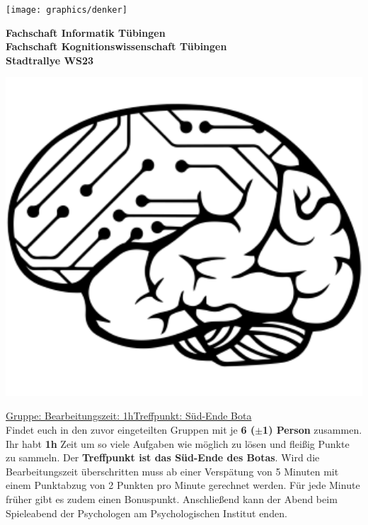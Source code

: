 \documentclass[11pt,paper=a4,answers]{exam}
\newcommand{\semester}{WS23}
\newcommand{\bearbeitungszeit}{1h}
\newcommand{\treffpunkt}{Süd-Ende Bota}
\newcommand{\treffpunktinline}{das Süd-Ende des Botas}
\begin{document}
	
\noindent
\begin{minipage}[l]{.1\textwidth}
\noindent
\texttt{[image: graphics/denker]}
\end{minipage}
\begin{minipage}{.8\textwidth}
\begin{center}
{\large \bfseries Fachschaft Informatik Tübingen \\
\bfseries Fachschaft Kognitionswissenschaft Tübingen \\
\vspace{0.5mm}
\Large Stadtrallye \semester}
\end{center}
\end{minipage}
\hspace{-12mm}
\begin{minipage}[r]{.1\textwidth}
\noindent
\includegraphics[width=1.5\textwidth]{graphics/kogni}
\end{minipage}
\par
\vspace{0.5cm}
\noindent
\uline{Gruppe:\hspace{2cm} \hfill Bearbeitungszeit: \bearbeitungszeit   \hfill     Treffpunkt: \treffpunkt}
\vspace{0.5cm}\\
Findet euch in den zuvor eingeteilten Gruppen mit je \textbf{6 ($\pm$1) Person} zusammen. Ihr habt
\textbf{\bearbeitungszeit} Zeit um so viele Aufgaben wie möglich zu lösen und
fleißig Punkte zu sammeln. Der \textbf{Treffpunkt ist \treffpunktinline}. Wird
die Bearbeitungszeit überschritten muss ab einer Verspätung von 5 Minuten mit einem Punktabzug von 2 Punkten pro Minute gerechnet werden. Für jede Minute früher gibt es zudem einen Bonuspunkt.
Anschließend kann der Abend beim Spieleabend der Psychologen am Psychologischen Institut enden. 
\end{document}
